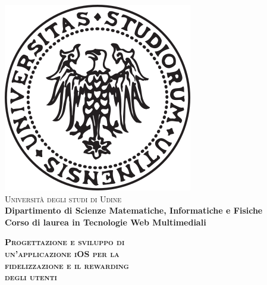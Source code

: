 \begin{titlepage}
\begin{center}
    \includegraphics[scale=0.35]{logo.png}\\
    \vspace{8mm}
    {\huge{\textsc{\textmd{Università degli studi di Udine}}}}\\
    \vspace{10mm}
    {\large{\textbf{ Dipartimento di Scienze Matematiche, Informatiche e Fisiche}}}\\
    \vspace{0.5cm}
    {\large{\textbf{ Corso di laurea in Tecnologie Web Multimediali}}}
\end{center}
\vspace{10mm}
\begin{center}
    {\LARGE\textbf{\textsc{Progettazione e sviluppo di}}}\\
    \vspace{6mm}
    {\LARGE\textbf{\textsc{un'applicazione iOS per la}}}\\
    \vspace{6mm}
    {\LARGE\textbf{\textsc{fidelizzazione e il rewarding}}}\\
    \vspace{6mm}
    {\LARGE\textsc{\textbf{degli utenti}}}\\
    \vspace{10mm}
\end{center}
\vfill
\par
\noindent


\end{titlepage}
